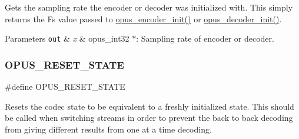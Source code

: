 Gets the sampling rate the encoder or decoder was initialized with. This simply returns the {\ttfamily Fs} value passed to \hyperlink{group__opus__encoder_ga363e90db0f434b2d8fde7dcf989270b1}{opus\+\_\+encoder\+\_\+init()} or \hyperlink{group__opus__decoder_ga40746b48a7b1653987a3a6db2ce3a40b}{opus\+\_\+decoder\+\_\+init()}. 
\begin{DoxyParams}[1]{Parameters}
\mbox{\tt out}  & {\em x} & {\ttfamily opus\+\_\+int32 $\ast$}\+: Sampling rate of encoder or decoder. \\
\hline
\end{DoxyParams}
\mbox{\label{group__opus__genericctls_gadc74e4fa8bcdf9994187d52d92207337}} 
\subsubsection{\texorpdfstring{O\+P\+U\+S\+\_\+\+R\+E\+S\+E\+T\+\_\+\+S\+T\+A\+TE}{OPUS\_RESET\_STATE}}
{\footnotesize\ttfamily \#define O\+P\+U\+S\+\_\+\+R\+E\+S\+E\+T\+\_\+\+S\+T\+A\+TE}

Resets the codec state to be equivalent to a freshly initialized state. This should be called when switching streams in order to prevent the back to back decoding from giving different results from one at a time decoding. 
